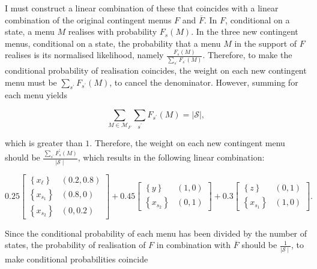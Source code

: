 I must construct a linear combination of these that coincides with a linear combination of the original contingent menus \( F \) and \( \overline{F} \). In \( F \), conditional on a state, a menu \( M \) realises with probability \( F_s \left( M \right) \). In the three new contingent menus, conditional on a state, the probability that a menu \( M \) in the support of \( F \) realises is its normalised likelihood, namely \( \frac{F_s \left( M \right)}{\sum_{s^{\prime}} F_{s^{\prime}} \left( M \right)} \). Therefore, to make the conditional probability of realisation coincides, the weight on each new contingent menu must be \( \sum_{s^{\prime}} F_{s^{\prime}} \left( M \right) \), to cancel the denominator. However, summing for each menu yields

\[
	\sum_{M \in \mathcal{M}_F} \sum_{s^{\prime}} F_{s^{\prime}} \left( M \right) = \mid \mathcal{S} \mid,
\]

which is greater than \( 1 \). Therefore, the weight on each new contingent menu should be \( \frac{\sum_{s^{\prime}} F_s^{\prime} \left( M \right)}{ \mid \mathcal{S} \mid} \), which results in the following linear combination:

\[
	0.25 \begin{bmatrix}
		\left\{ x_{\ell} \right\} & \left( 0.2, 0.8 \right) \\
		\left\{ x_{s_1} \right\}  & \left( 0.8, 0 \right)   \\
		\left\{ x_{s_2} \right\}  & \left( 0, 0.2 \right)
	\end{bmatrix}
	+ 0.45
	\begin{bmatrix}
		\left\{ y \right\}       & \left( 1, 0 \right) \\
		\left\{ x_{s_2} \right\} & \left( 0, 1 \right)
	\end{bmatrix}
	+ 0.3
	\begin{bmatrix}
		\left\{ z \right\}       & \left( 0, 1 \right) \\
		\left\{ x_{s_1} \right\} & \left( 1, 0 \right)
	\end{bmatrix} .
\]

Since the conditional probability of each menu has been divided by the number of states, the probability of realisation of \( F \) in combination with \( \overline{F} \) should be \( \frac{1}{\mid \mathcal{S} \mid} \), to make conditional probabilities coincide


